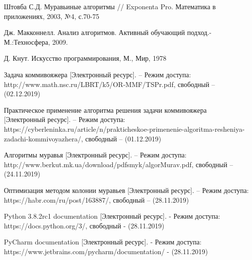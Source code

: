 \documentclass[a4paper,12pt]{article}
\begin{document}
\begin{thebibliography}{7}
	
	Штовба С.Д. Муравьиные алгоритмы // Exponenta Pro. Математика в приложениях, 2003, №4, с.70-75
	
	Дж. Макконнелл. Анализ алгоритмов. Активный 
	обучающий 
	подход.-М.:Техносфера, 2009.
	
	Д. Кнут. Искусство программирования, М., Мир, 1978
	
	Задача коммивояжера  [Электронный ресурс]. – Режим доступа: http://www.math.nsc.ru/LBRT/k5/OR-MMF/TSPr.pdf, свободный – (02.12.2019)
	
	Практическое применение алгоритма решения задачи коммивояжера [Электронный ресурс]. – Режим доступа: https://cyberleninka.ru/article/n/prakticheskoe-primenenie-algoritma-resheniya-zadachi-kommivoyazhera/, свободный – (01.12.2019)
	
	Алгоритмы муравья [Электронный ресурс]. – Режим доступа: http://www.berkut.mk.ua/download/pdfsmyk/algorMurav.pdf, свободный – (24.11.2019)
	
	Оптимизация методом колонии муравьев [Электронный ресурс]. – Режим доступа: https://habr.com/ru/post/163887/, свободный – (28.11.2019)
	
	Python 3.8.2rc1 documentation [Электронный ресурс]. - Режим доступа: https://docs.python.org/3/, свободный - (28.11.2019)
	
	PyCharm documentation [Электронный ресурс]. - Режим доступа: https://www.jetbrains.com/pycharm/documentation/ - (28.11.2019)
	
\end{thebibliography}
\end{document}
